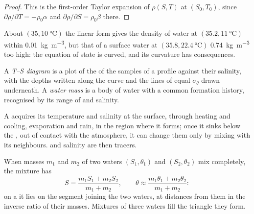 \begin{proof}
This is the first-order Taylor expansion of $\rho(S, T)$ at $(S_0, T_0)$, since
$\partial\rho/\partial T = -\rho_0\alpha$ and $\partial\rho/\partial S =
\rho_0\beta$ there.
\end{proof}

About $(35, \qty{10}{\celsius})$ the linear form gives the density of water at
$(35.2, \qty{11}{\celsius})$ within \qty{0.01}{kg.m^{-3}}, but that of a surface
water at $(35.8, \qty{22.4}{\celsius})$ \qty{0.74}{kg.m^{-3}} too high: the
equation of state is curved, and its curvature has consequences.

\begin{definition}\label{def:b1:fluid-envelopes-structure:ts-diagram}
A \emph{T--S diagram} is a plot of the  of the samples of a profile against their salinity, with the depths
written along the curve and the lines of equal $\sigma_\theta$ drawn underneath.
A \emph{water mass} is a body of water with a common formation
history, recognised by its range of  and salinity.
\end{definition}

A  acquires its temperature and salinity at the surface, through
heating and cooling, evaporation and rain, in the region where it forms; once it
sinks below the , out of contact with the atmosphere, it can change
them only by mixing with its neighbours.  and salinity are
then tracers.

\begin{proposition}\label{prop:b1:fluid-envelopes-structure:mixing}
When masses $m_1$ and $m_2$ of two waters $(S_1, \theta_1)$ and $(S_2, \theta_2)$
mix completely, the mixture has
\[
  S = \frac{m_1 S_1 + m_2 S_2}{m_1 + m_2},\qquad
  \theta \approx \frac{m_1 \theta_1 + m_2 \theta_2}{m_1 + m_2}:
\]
on a  it lies on the segment joining the two waters, at distances
from them in the inverse ratio of their masses. Mixtures of three waters fill the
triangle they form.
\end{proposition}

